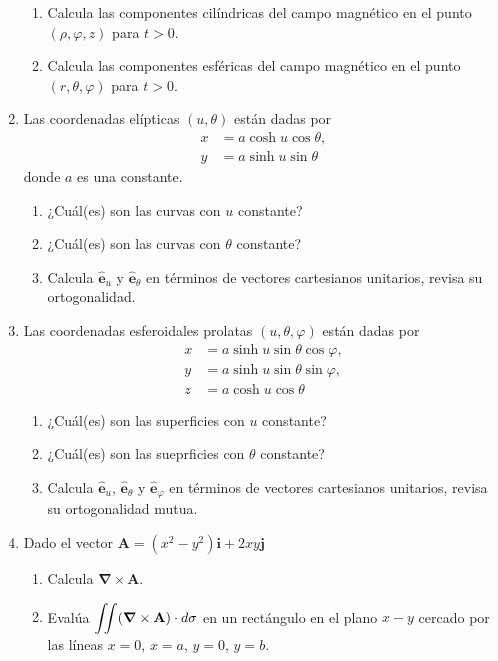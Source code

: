 \documentclass[12pt]{article}
\begin{document}
\begin{enumerate}
\begin{enumerate}
\item Calcula las componentes cilíndricas del campo magnético en el punto $(\rho, \varphi, z)$ para $t>0$.
\item Calcula las componentes esféricas del campo magnético en el punto $(r, \theta, \varphi)$ para $t>0$.
\end{enumerate}
\item Las coordenadas elípticas $(u,\theta)$ están dadas por
\[  \begin{split}
x &= a \cosh u \cos \theta, \\
y &= a \sinh u \sin \theta
\end{split} \]
donde $a$ es una constante.
\begin{enumerate}
\item ¿Cuál(es) son las curvas con $u$ constante?
\item ¿Cuál(es) son las curvas con $\theta$ constante?
\item Calcula $\mathbf{\widehat{e}}_{u}$ y $\mathbf{\widehat{e}}_{\theta}$ en términos de vectores cartesianos unitarios, revisa su ortogonalidad.
\end{enumerate}
\item Las coordenadas esferoidales prolatas $(u, \theta, \varphi)$ están dadas por
\[  \begin{split}
x &= a \sinh u \sin \theta \cos \varphi, \\
y &= a \sinh u \sin \theta \sin \varphi, \\
z &= a \cosh u \cos \theta
\end{split} \]
\begin{enumerate}
\item ¿Cuál(es) son las superficies con $u$ constante?
\item ¿Cuál(es) son las sueprficies con $\theta$ constante?
\item Calcula $\mathbf{\widehat{e}}_{u}$,  $\mathbf{\widehat{e}}_{\theta}$ y $\mathbf{\widehat{e}}_{\varphi}$ en términos de vectores cartesianos unitarios, revisa su ortogonalidad mutua.
\end{enumerate}
\item Dado el vector $\mathbf{A} = (x^{2} - y^{2}) \mathbf{i} +  2xy \mathbf{j}$
\begin{enumerate}
\item Calcula $\bm{\nabla} \times \mathbf{A}$.
\item Evalúa $\mathlarger{\iint} (\bm{\nabla} \times \mathbf{A}) \cdot d \sigma $ en un rectángulo en el plano $x-y$ cercado por las líneas $x=0$, $x=a$, $y=0$, $y=b$.

\end{enumerate}
\end{enumerate}
\end{document}
